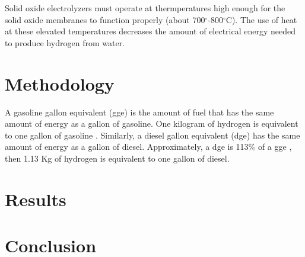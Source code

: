 \documentclass{anstrans}
\begin{document}
Solid oxide electrolyzers must operate at thermperatures high enough for the solid oxide membranes to function properly (about 700$^{\circ}$-800$^{\circ}$C). The use of heat at these elevated temperatures decreases the amount of electrical energy needed to produce hydrogen from water.


\section{Methodology}
A gasoline gallon equivalent (gge) is the amount of fuel that has the same amount of energy as a gallon of gasoline. One kilogram of hydrogen is equivalent to one gallon of gasoline \cite{noauthor_hydrogen_nodate}.
Similarly, a diesel gallon equivalent (dge) has the same amount of energy as a gallon of diesel. Approximately, a dge is 113\% of a gge \cite{noauthor_fuel_2014}, then 1.13 Kg of hydrogen is equivalent to one gallon of diesel.

\section{Results}

\section{Conclusion}



\end{document}
